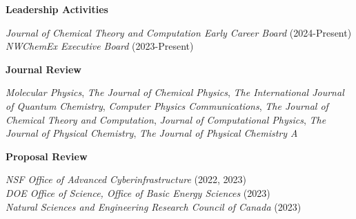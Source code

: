 \documentclass[10pt]{res} %
\begin{document}
\begin{resume}
\vspace{20pt}
\centerline{\bf Leadership Activities}
\vspace{-20pt}
\begin{center}
\emph{Journal of Chemical Theory and Computation Early Career Board} \hfill (2024-Present)\\
\emph{NWChemEx Executive Board} \hfill (2023-Present)
\end{center}


\centerline{\bf Journal Review}
\vspace{-20pt}
\begin{center}
  \emph{Molecular Physics}, 
  \emph{The Journal of Chemical Physics}, 
  \emph{The International Journal of Quantum Chemistry}, 
  \emph{Computer Physics Communications},
  \emph{The Journal of Chemical Theory and Computation},
  \emph{Journal of Computational Physics},
  \emph{The Journal of Physical Chemistry}, 
  \emph{The Journal of Physical Chemistry A} 
\end{center}

\centerline{\bf Proposal Review}
\vspace{-15pt}
\begin{center}
\emph{NSF Office of Advanced Cyberinfrastructure} \hfill (2022, 2023) \\
\emph{DOE Office of Science, Office of Basic Energy Sciences} \hfill (2023) \\
\emph{Natural Sciences and Engineering Research Council of Canada} \hfill (2023)
\end{center}


\end{resume}
\end{document}
